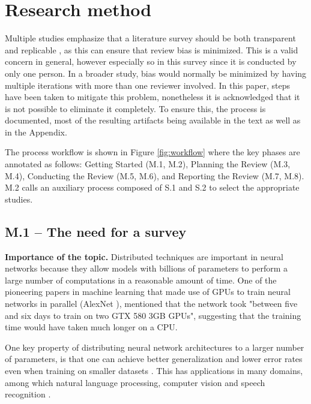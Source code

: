 \section{Research method}
\label{sec:protocol}

Multiple studies emphasize that a literature survey should be both transparent and replicable
\cite{keele_systematic_2007, dos_santos_sustainable_2024-1}, as this can ensure that review bias is
minimized. This is a valid concern in general, however especially so in this survey since it is
conducted by only one person. In a broader study, bias would normally be minimized by having
multiple iterations with more than one reviewer involved. In this paper, steps have been taken to
mitigate this problem, nonetheless it is acknowledged that it is not possible to eliminate it
completely. To ensure this, the process is documented, most of the resulting artifacts being
available in the text as well as in the Appendix.


The process workflow is shown in Figure \ref{fig:workflow} where the key phases are annotated as
follows: Getting Started (M.1, M.2), Planning the Review (M.3, M.4), Conducting the Review (M.5,
M.6), and Reporting the Review (M.7, M.8). M.2 calls an auxiliary process composed of S.1 and S.2
to select the appropriate studies.

\subsection{M.1 -- The need for a survey}
\label{sec:need_for_survey}

\textbf{Importance of the topic.}
Distributed techniques are important in neural networks because they allow models with billions of
parameters to perform a large number of computations in a reasonable amount of time. One of the
pioneering papers in machine learning that made use of GPUs to train neural networks in parallel
(AlexNet \cite{krizhevsky_imagenet_2012}), mentioned that the network took "between five and six days to
train on two GTX 580 3GB GPUs", suggesting that the training time would have taken much longer on a
CPU.

One key property of distributing neural network architectures to a larger number of parameters, is
that one can achieve better generalization and lower error rates even when training on smaller
datasets \cite{kaplan_scaling_2020}. This has applications in many domains, among which natural
language processing, computer vision and speech recognition \cite{noauthor_papers_nodate}.

